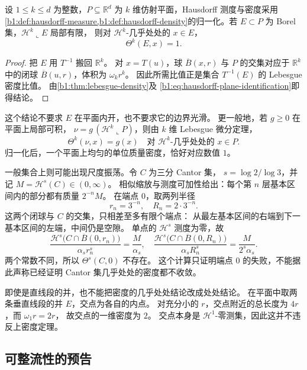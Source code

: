 \begin{proposition}\label{b1:prop:plane-hausdorff-density}
设 \(1\le k\le d\) 为整数，\(P\subseteq\mathbb R^d\) 为 \(k\) 维仿射平面，Hausdorff 测度与密度采用\cref{b1:def:hausdorff-measure,b1:def:hausdorff-density}的归一化。若 \(E\subset P\) 为 Borel 集，\(\mathcal H^k\llcorner E\) 局部有限，
则对 \(\mathcal H^k\)-几乎处处的 \(x\in E\)，
\[
 \Theta^k(E,x)=1.
\]
\end{proposition}
\begin{proof}
把 \(E\) 用 \(T^{-1}\) 搬回 \(\mathbb R^k\)。
对 \(x=T(u)\)，球 \(\overline B(x,r)\) 与 \(P\) 的交集对应于
\(\mathbb R^k\) 中的闭球 \(\overline B(u,r)\)，体积为 \(\omega_k r^k\)。
因此所需比值正是集合 \(T^{-1}(E)\) 的 Lebesgue 密度比值。
由\cref{b1:thm:lebesgue-density}及%
\eqref{b1:eq:hausdorff-plane-identification}即得结论。
\end{proof}

这个结论不要求 \(E\) 在平面内开，也不要求它的边界光滑。
更一般地，若 \(g\geq0\) 在平面上局部可积，
\(\nu=g\,(\mathcal H^k\llcorner P)\)，则由 \(k\) 维 Lebesgue 微分定理，
\[
 \Theta^k(\nu,x)=g(x)
 \quad\text{对 }\mathcal H^k\text{-几乎处处的 }x\in P.
\]
归一化后，一个平面上均匀的单位质量密度，恰好对应数值 \(1\)。

\ProseParagraphBreak

一般集合上则可能出现尺度振荡。令 \(C\) 为三分 Cantor 集，
\(s=\log2/\log3\)，并记 \(M=\mathcal H^s(C)\in(0,\infty)\)。
相似缩放与测度可加性给出：每个第 \(n\) 层基本区间内的部分都有质量 \(2^{-n}M\)。
在端点 \(0\)，取两列半径
\[
 r_n=3^{-n},\quad R_n=2\cdot3^{-n}.
\]
这两个闭球与 \(C\) 的交集，只相差至多有限个端点：
从最左基本区间的右端到下一基本区间的左端，中间仍是空隙。
单点的 \(\mathcal H^s\) 测度为零，故
\[
 \frac{\mathcal H^s\bigl(C\cap\overline B(0,r_n)\bigr)}{\alpha_s r_n^s}
 =\frac{M}{\alpha_s},
 \quad
 \frac{\mathcal H^s\bigl(C\cap\overline B(0,R_n)\bigr)}{\alpha_s R_n^s}
 =\frac{M}{2^s\alpha_s}.
\]
两个常数不同，所以 \(\Theta^s(C,0)\) 不存在。
这个计算只证明端点 \(0\) 的失败，不能据此声称已经证明
Cantor 集几乎处处的密度都不收敛。

\ProseParagraphBreak

即使是直线段的并，也不能把密度的几乎处处结论改成处处结论。
在平面中取两条垂直线段的并 \(E\)，交点为各自的内点。
对充分小的 \(r\)，交点附近的总长度为 \(4r\)，而 \(\omega_1r=2r\)，
故交点的一维密度为 \(2\)。
交点本身是 \(\mathcal H^1\)-零测集，因此这并不违反上密度定理。

\subsection{可整流性的预告}
\label{b1:subsec:150504}

